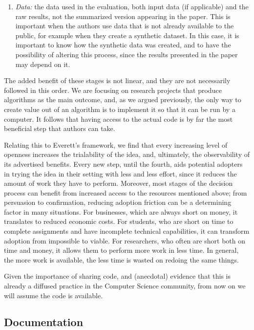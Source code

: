 \documentclass[12pt]{article}
\begin{document}
\begin{enumerate}
\item \emph{Data:} the data used in the evaluation, both input data (if applicable) and the raw results, not the summarized version appearing in the paper. This is important when the authors use data that is not already available to the public, for example when they create a synthetic dataset. In this case, it is important to know how the synthetic data was created, and to have the possibility of altering this process, since the results presented in the paper may depend on it.
\end{enumerate}

The added benefit of these stages is not linear, and they are not necessarily followed in this order. We are focusing on research projects that produce algorithms as the main outcome, and, as we argued previously, the only way to create value out of an algorithm is to implement it so that it can be run by a computer. It follows that having access to the actual code is by far the most beneficial step that authors can take.

Relating this to Everett's framework, we find that every increasing level of openness increases the trialability of the idea, and, ultimately, the observability of its advertised benefits. Every new step, until the fourth, aids potential adopters in trying the idea in their setting with less and less effort, since it reduces the amount of work they have to perform. Moreover, most stages of the decision process can benefit from increased access to the resources mentioned above; from persuasion to confirmation, reducing adoption friction can be a determining factor in many situations. For businesses, which are always short on money, it translates to reduced economic costs. For students, who are short on time to complete assignments and have incomplete technical capabilities, it can transform adoption from impossible to viable. For researchers, who often are short both on time and money, it allows them to perform more work in less time. In general, the more work is available, the less time is wasted on redoing the same things.

Given the importance of sharing code, and (anecdotal) evidence that this is already a diffused practice in the Computer Science community, from now on we will assume the code is available.

\subsection{Documentation}
\label{sec:org2f93830}
\end{document}
